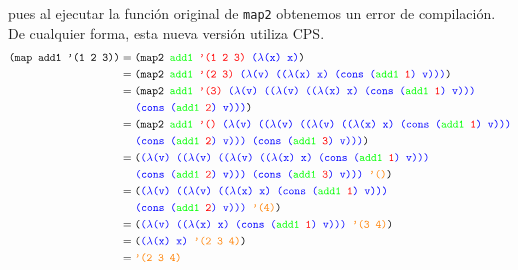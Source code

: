 \documentclass[letterpaper,11pt]{article}
\begin{document}
\begin{enumerate}
    pues al ejecutar la función original de \texttt{map2} obtenemos un error de 
    compilación. De cualquier forma, esta nueva versión utiliza CPS.
    \begin{align*}
        \texttt{(map add1 '(1 2 3))}
        &= \texttt{(map2 \textcolor{green}{add1} 
                         \textcolor{red}{'(1 2 3)} 
                         \textcolor{blue}{($\lambda$(x) x)})} \\ 
        &= \texttt{(map2 \textcolor{green}{add1}
                         \textcolor{red}{'(2 3)}
                         \textcolor{blue}{($\lambda$(v) (($\lambda$(x) x) (cons (\textcolor{green}{add1} \textcolor{red}{1}) v)))})} \\ 
        &= \texttt{(map2 \textcolor{green}{add1}
                         \textcolor{red}{'(3)}
                         \textcolor{blue}{($\lambda$(v) (($\lambda$(v) (($\lambda$(x) x) (cons (\textcolor{green}{add1} \textcolor{red}{1}) v)))}} \\
        &\; \; \; \; \; 
                         \texttt{\textcolor{blue}{(cons (\textcolor{green}{add1} \textcolor{red}{2}) v)))})} \\ 
        &= \texttt{(map2 \textcolor{green}{add1}
                         \textcolor{red}{'()}
                         \textcolor{blue}{($\lambda$(v) (($\lambda$(v) (($\lambda$(v) (($\lambda$(x) x) (cons (\textcolor{green}{add1} \textcolor{red}{1}) v)))}} \\ 
        &\; \; \; \; \; 
                         \texttt{\textcolor{blue}{(cons (\textcolor{green}{add1} \textcolor{red}{2}) v))) (cons (\textcolor{green}{add1} \textcolor{red}{3}) v)))})} \\
        &= \texttt{(\textcolor{blue}{($\lambda$(v) (($\lambda$(v) (($\lambda$(v) (($\lambda$(x) x) (cons (\textcolor{green}{add1} \textcolor{red}{1}) v)))}} \\ 
        &\; \; \; \; \; 
                         \texttt{\textcolor{blue}{(cons (\textcolor{green}{add1} \textcolor{red}{2}) v))) (cons (\textcolor{green}{add1} \textcolor{red}{3}) v)))} \textcolor{orange}{'()})} \\
        &= \texttt{(\textcolor{blue}{($\lambda$(v) (($\lambda$(v) (($\lambda$(x) x) (cons (\textcolor{green}{add1} \textcolor{red}{1}) v)))}} \\ 
        &\; \; \; \; \; 
                         \texttt{\textcolor{blue}{(cons (\textcolor{green}{add1} \textcolor{red}{2}) v)))} \textcolor{orange}{'(4)})} \\
        &= \texttt{(\textcolor{blue}{($\lambda$(v) (($\lambda$(x) x) (cons (\textcolor{green}{add1} \textcolor{red}{1}) v)))} \textcolor{orange}{'(3 4)})} \\ 
        &= \texttt{(\textcolor{blue}{($\lambda$(x) x)} \textcolor{orange}{'(2 3 4)})} \\ 
        &= \texttt{\textcolor{orange}{'(2 3 4)}}
    \end{align*}
\end{enumerate}
\end{document}
